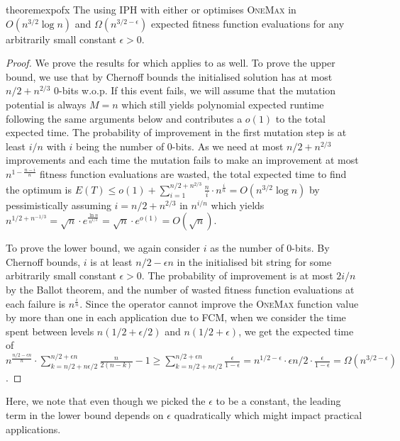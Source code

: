 \begin{restatable}{theorem}{expofx} \label{cor:omexpohd}
	The {\oneoneIA } using IPH with either {\expoF } or {\expoHD } optimises \textsc{OneMax} in $O(n^{3/2} \log 
	n)$ and $\Omega(n^{3/2-\epsilon})$ expected fitness function evaluations for 
	any arbitrarily small constant $\epsilon>0$.
\end{restatable}

\begin{proof}
	We prove the results for \expoF{} which applies to \expoHD{} as well. 
	To prove the upper bound, we use that by Chernoff bounds the initialised solution has at most $n/2+ n^{2/3}$ 0-bits w.o.p. {\color{black} If this event fails, we will assume that the mutation potential is always $M=n$ which still yields polynomial expected runtime following the same arguments below and contributes a $o(1)$ to the total expected time}. The probability of improvement in the first mutation step is at least $i/n$ with $i$ being the number of 0-bits. As we need at most $n/2+n^{2/3}$ improvements and each time the mutation fails to make an improvement at most $n^{1-\frac{n-i}{n}}$ fitness function evaluations are wasted, the total expected time to find the optimum is $E(T) \leq o(1) + \sum_{i=1}^{n/2+n^{2/3}} \frac{n}{i} \cdot n^{\frac{i}{n}}= O (n^{3/2} \log n)$ by pessimistically assuming $i=n/2+n^{2/3}$ in $n^{i/n}$ {\color{black} which yields $n^{1/2+n^{-1/3}}=\sqrt{n} \cdot e^{\frac{\ln n}{n^{1/3}}}=\sqrt{n} \cdot e^{o(1)}=O(\sqrt{n})$}.
	
	To prove the lower bound, we again consider $i$ as the number of 0-bits. By Chernoff 
	bounds, $i$ is at least $n/2-\epsilon n$  in the initialised bit string for some arbitrarily small constant $\epsilon>0$. 
	The probability of improvement is at most $2i/n$ by the Ballot theorem, and the number of wasted fitness function evaluations at each failure is 
	$n^{\frac{i}{n}}$. {\color{black} Since the operator cannot improve the \textsc{OneMax} function value by more than one in each application due to FCM,} when we consider the time spent between levels $n(1/2 + 
	\epsilon/2)$ and $n(1/2+\epsilon)$, we get the expected time of 
	{\color{black}$n^{\frac{n/2-\epsilon n}{n}} \cdot \sum_{k=n/2+n\epsilon/2 }^{n/2+\epsilon 
			n} \frac{n}{2(n-k)}-1 \geq \sum_{k=n/2+n\epsilon/2 }^{n/2+\epsilon 
			n} \frac{\epsilon}{1-\epsilon}=n^{1/2-\epsilon} \cdot \epsilon n/2 \cdot \frac{\epsilon}{1-\epsilon}= 
		\Omega(n^{3/2-\epsilon})$.}
\end{proof}

{\color{black}Here, we note that even though we picked the $\epsilon$ to be a constant, the leading term in the lower bound depends on $\epsilon$ quadratically which might impact practical applications.}
